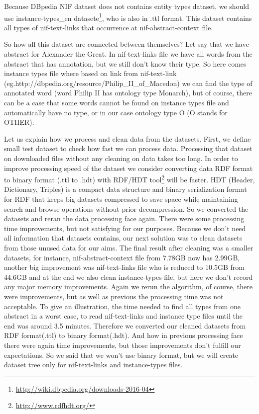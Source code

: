 \documentclass[thesis=M,english]{FITthesis}[2018/05/30]
\begin{document}
	Because DBpedia NIF dataset does not contains entity types dataset, we should use instance-types\_en datasete\footnote{\url{http://wiki.dbpedia.org/downloads-2016-04}}, who is also in .ttl format. This dataset contains all types of nif-text-links that occurrence at nif-abstract-context file.

	So how all this dataset are connected between themselves? Let say that we have abstract for Alexander the Great. In nif-text-links file we have all words from the abstract that has annotation, but we still don't know their type. So here comes instance types file where based on link from nif-text-link (eg.http://dbpedia.org/resource/Philip\_II\_of\_Macedon) we can find the type of annotated word (word Philip II has ontology type Monarch), but of course, there can be a case that some words cannot be found on instance types file and automatically have no type, or in our case ontology type O (O stands for OTHER).

	Let us explain how we process and clean data from the datasets. First, we define small test dataset to check how fast we can process data. Processing that dataset on downloaded files without any cleaning on data takes too long. In order to improve processing speed of the dataset we consider converting data RDF format to binary format (.ttl to .hdt) with RDF/HDT tool\footnote{\url{http://www.rdfhdt.org/}} will be faster. HDT (Header, Dictionary, Triples)\cite{FMPGPA:13} is a compact data structure and binary serialization format for RDF that keeps big datasets compressed to save space while maintaining search and browse operations without prior decompression. So we converted the datasets and reran the data processing face again. There were some processing time improvements, but not satisfying for our purposes. Because we don't need all information that datasets contains, our next solution was to clean datasets from those unused data for our aims. The final result after cleaning was a smaller datasets, for instance, nif-abstract-context file from 7.78GB now has 2.99GB, another big improvement was nif-text-links file who is reduced to 10.5GB from 44.6GB and at the end we also clean instance-types file, but here we don't record any major memory improvements. Again we rerun the algorithm, of course, there were improvements, but as well as previous the processing time was not acceptable. To give an illustration, the time needed to find all types from one abstract in a worst case, to read nif-text-links and instance type files until the end was around 3.5 minutes. Therefore we converted our cleaned datasets from RDF format(.ttl) to binary format(.hdt). And how in previous processing face there were again time improvements, but those improvements don't fulfill our expectations. So we said that we won't use binary format, but we will create dataset tree only for nif-text-links and instance-types files.
	
\end{document}
